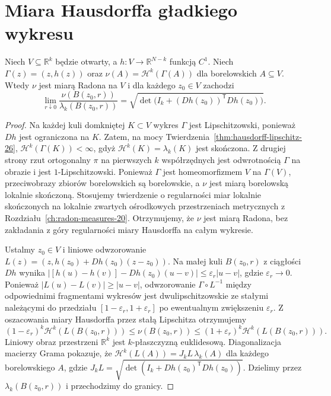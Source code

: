 \section{Miara Hausdorffa gładkiego wykresu}
\begin{lemat}
\label{lem:graph-hausdorff-28}
Niech $V\subseteq\mathbb R^k$ będzie otwarty,
a $h:V\to\mathbb R^{N-k}$ funkcją $C^1$.
Niech $\Gamma(z)=(z,h(z))$ oraz
$\nu(A)=\mathcal H^k(\Gamma(A))$
dla borelowskich $A\subseteq V$. Wtedy $\nu$
jest miarą Radona na $V$ i dla każdego
$z_0\in V$ zachodzi
\[
 \lim_{r\downarrow0}
 \frac{\nu(B(z_0,r))}{\lambda_k(B(z_0,r))}
 =\sqrt{\det\bigl(I_k+(Dh(z_0))^{\mathsf T}Dh(z_0)\bigr)}.
\]
\end{lemat}
\begin{proof}
Na każdej kuli domkniętej $K\subset V$ wykres $\Gamma$
jest Lipschitzowski, ponieważ $Dh$ jest ograniczona
na $K$. Zatem, na mocy
Twierdzenia~\ref{thm:hausdorff-lipschitz-26},
$\mathcal H^k(\Gamma(K))<\infty$, gdyż
$\mathcal H^k(K)=\lambda_k(K)$ jest skończona.
Z drugiej strony rzut ortogonalny $\pi$ na
pierwszych $k$ współrzędnych jest odwrotnością
$\Gamma$ na obrazie i jest $1$-Lipschitzowski.
Ponieważ $\Gamma$ jest homeomorfizmem $V$ na
$\Gamma(V)$, przeciwobrazy zbiorów borelowskich
są borelowskie, a $\nu$ jest miarą borelowską
lokalnie skończoną. Stosujemy twierdzenie o
regularności miar lokalnie skończonych na lokalnie
zwartych ośrodkowych przestrzeniach metrycznych
z Rozdziału~\ref{ch:radon-measures-20}.
Otrzymujemy, że $\nu$ jest miarą Radona,
bez zakładania z góry regularności miary
Hausdorffa na całym wykresie.

Ustalmy $z_0\in V$ i liniowe odwzorowanie
$L(z)=(z,h(z_0)+Dh(z_0)(z-z_0))$.
Na małej kuli $B(z_0,r)$ z ciągłości $Dh$ wynika
$|[h(u)-h(v)]-Dh(z_0)(u-v)|\le\varepsilon_r|u-v|$,
gdzie $\varepsilon_r\to0$.
Ponieważ $|L(u)-L(v)|\ge|u-v|$,
odwzorowanie $\Gamma\circ L^{-1}$ między
odpowiednimi fragmentami wykresów jest
dwulipschitzowskie ze stałymi należącymi
do przedziału $[1-\varepsilon_r,1+\varepsilon_r]$
po ewentualnym zwiększeniu $\varepsilon_r$.
Z oszacowania miary Hausdorffa przez stałą
Lipschitza otrzymujemy
\[
 (1-\varepsilon_r)^k\mathcal H^k(L(B(z_0,r)))
 \le\nu(B(z_0,r))\le
 (1+\varepsilon_r)^k\mathcal H^k(L(B(z_0,r))).
\]
Liniowy obraz przestrzeni $\mathbb R^k$ jest
$k$-płaszczyzną euklidesową. Diagonalizacja
macierzy Grama pokazuje, że
$\mathcal H^k(L(A))=J_kL\,\lambda_k(A)$
dla każdego borelowskiego $A$, gdzie
$J_kL=\sqrt{\det(I_k+Dh(z_0)^{\mathsf T}Dh(z_0))}$.
Dzielimy przez $\lambda_k(B(z_0,r))$ i
przechodzimy do granicy.
\end{proof}

